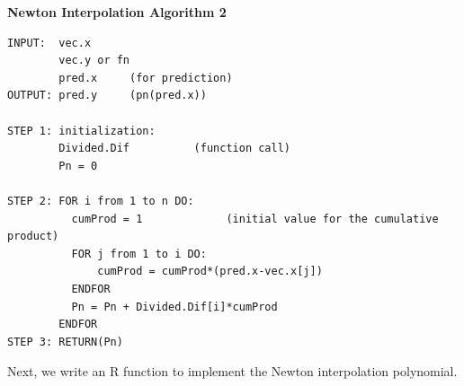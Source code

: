 \documentclass[
]{book}
\begin{document}
\textbf{Newton Interpolation Algorithm 2}

\begin{verbatim}
INPUT:  vec.x
        vec.y or fn
        pred.x     (for prediction)
OUTPUT: pred.y     (pn(pred.x))

STEP 1: initialization:
        Divided.Dif          (function call)
        Pn = 0
        
STEP 2: FOR i from 1 to n DO:
          cumProd = 1             (initial value for the cumulative product)
          FOR j from 1 to i DO:
              cumProd = cumProd*(pred.x-vec.x[j])
          ENDFOR
          Pn = Pn + Divided.Dif[i]*cumProd
        ENDFOR
STEP 3: RETURN(Pn)
\end{verbatim}

Next, we write an R function to implement the Newton interpolation polynomial.
\end{document}
